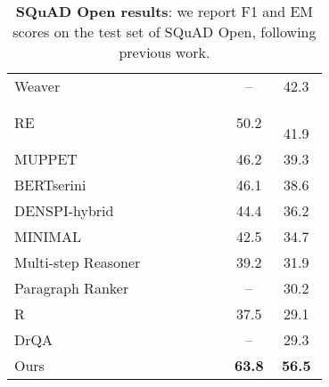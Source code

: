 \documentclass{article} \usepackage{iclr2020_conference,times}
\begin{document}
\begin{table}[!t]
\begin{minipage}[t]{.5\linewidth}
{\begin{tabular}{ p{0.7\linewidth} | c c }
Weaver~\citep{raison2018weaver}& -- & 42.3 \\
RE~\citep{hu2019retrieve} & 50.2  &　41.9 \\
MUPPET~\citep{muppet2019multihop} & 46.2 & 39.3 \\
BERTserini~\citep{yang-etal-2019-end-end}& 46.1  & 38.6 \\
DENSPI-hybrid~\citep{denspi}  & 44.4  & 36.2 \\
MINIMAL~\citep{min2018efficient} &42.5 & 34.7 \\
Multi-step Reasoner~\citep{das2019multi} & 39.2   & 31.9\\
Paragraph Ranker~\citep{lee2018ranking} & -- & 30.2 \\
R~\citep{wang2018r} & 37.5 & 29.1 \\
DrQA~\citep{chen2017reading}& -- & 29.3 \\
\hline
Ours &  \bf 63.8 &  \bf 56.5  \\
  \bottomrule
\end{tabular}
    \caption{{\bf SQuAD Open results}: we report F1 and EM scores on the test set of SQuAD Open, following previous work.
    }
    \label{table:main_results_squad}
    }
\end{minipage}
\end{table}
\end{document}
